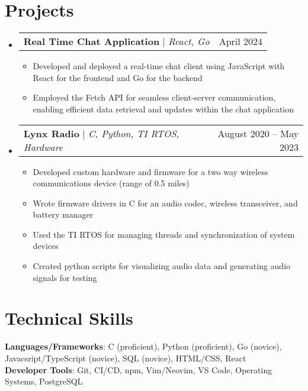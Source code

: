 \documentclass[letterpaper,11pt]{article}
\makeatletter
\newcommand{\resumeItem}[1]{
  \item\small{
    {#1 \vspace{-2pt}}
  }
}
\newcommand{\resumeProjectHeading}[2]{
    \item
    \begin{tabular*}{0.97\textwidth}{l@{\extracolsep{\fill}}r}
      \small#1 & #2 \\
    \end{tabular*}\vspace{-7pt}
}
\newcommand{\resumeSubHeadingListStart}{\begin{itemize}[leftmargin=0.15in, label={}]}
\newcommand{\resumeSubHeadingListEnd}{\end{itemize}}
\newcommand{\resumeItemListStart}{\begin{itemize}}
\newcommand{\resumeItemListEnd}{\end{itemize}\vspace{-5pt}}
\makeatother
\begin{document}
\section{Projects}
    \resumeSubHeadingListStart
      \resumeProjectHeading
          {\textbf{Real Time Chat Application} $|$ \emph{React, Go}}{April 2024}
          \resumeItemListStart
            \resumeItem{Developed and deployed a real-time chat client using JavaScript with React for the frontend and Go for the backend}
            \resumeItem{Employed the Fetch API for seamless client-server communication, enabling efficient data retrieval and updates within the chat application}
          \resumeItemListEnd
      \resumeProjectHeading
          {\textbf{Lynx Radio} $|$ \emph{C, Python, TI RTOS, Hardware}}{August 2020 -- May 2023}
          \resumeItemListStart
            \resumeItem{Developed custom hardware and firmware for a two way wireless communications device (range of 0.5 miles)}
            \resumeItem{Wrote firmware drivers in C for an audio codec, wireless transceiver, and battery manager}
            \resumeItem{Used the TI RTOS for managing threads and synchronization of system devices}
            \resumeItem{Created python scripts for visualizing audio data and generating audio signals for testing}
          \resumeItemListEnd
    \resumeSubHeadingListEnd

\section{Technical Skills}
 \begin{itemize}[leftmargin=0.15in, label={}]
    \small{\item{
     \textbf{Languages/Frameworks}{: C (proficient), Python (proficient), Go (novice), Javacsript/TypeScript (novice), SQL (novice), HTML/CSS, React} \\
     \textbf{Developer Tools}{: Git, CI/CD, npm, Vim/Neovim, VS Code, Operating Systems, PostgreSQL} \\
    }}
 \end{itemize}


\end{document}

